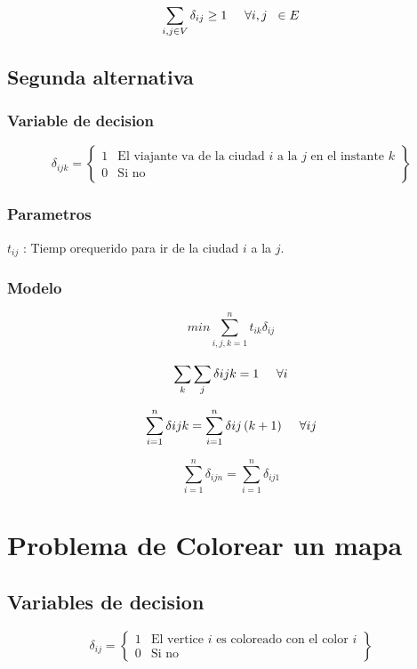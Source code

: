 \documentclass[]{article}
\begin{document}
{$$\sum_{i,j \in V}^{} \delta_{ij} \geq 1  \hspace*{0.5cm} \forall i,j \hspace*{0.2cm} \in E$$


\subsection{Segunda alternativa} 

\subsubsection{Variable de decision} 

\begin{equation*}
\delta_{ijk} = 
\left\{ \begin{array}{cl}
1 & \mbox{El viajante va de la ciudad $i$ a la $j$ en el instante $k$}\\
0 & \mbox{Si no}
\end{array} \right\}
\end{equation*}

\subsubsection{Parametros}

$t_{ij} $ : Tiemp orequerido para ir de la ciudad $i$ a la $j$. 

\subsubsection{Modelo}



$$min \sum_{i,j,k=1}^{n} t_{ik} \delta_{ij}$$

$$\sum_{k}^{} \sum_{j}^{}  \delta{ijk} =  1 \hspace*{0.5cm} \forall i  $$


$$\sum_{i=1}^{n} \delta{ijk} =  \sum_{i=1}^{n} \delta{ij \left(k+1\right)}  \hspace{0.5cm}\forall i j$$

$$\sum_{i=1}^{n} \delta_{ijn} =  \sum_{i=1}^{n} \delta_{ij1}$$

\section{Problema de Colorear un mapa} 

\subsection{Variables de decision} 
\begin{equation*}
\delta_{ij} = 
 \left\{ \begin{array}{cl}
 1 & \mbox{El vertice $i$ es coloreado con el color $i$}\\
 0 & \mbox{Si no}
 \end{array} \right\}
\end{equation*}

}
\end{document}
